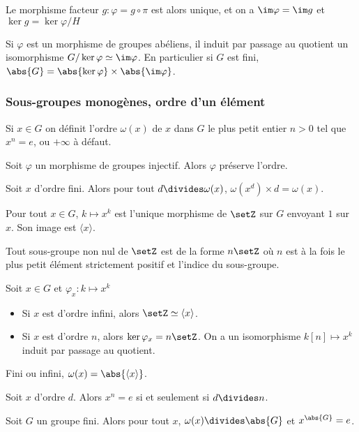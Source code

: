 \documentclass[a4paper,11pt,twocolumn]{article}\usepackage[landscape]{geometry}
\begin{document}
      Le morphisme facteur $g: \varphi = g\circ \pi$ est alors unique, et on a $\im\varphi = \im g$ et $\ker g = \ker\varphi/H$

       Si $\varphi$ est un morphisme de groupes abéliens, il induit par passage au quotient un isomorphisme $G/\ker\varphi \simeq \im\varphi$. En particulier si $G$ est fini, $\abs{G} = \abs{\ker\varphi}\times\abs{\im\varphi}$.

    \subsubsection{Sous-groupes monogènes, ordre d'un élément}

       Si $x\in G$ on définit l'ordre $\omega(x)$ de $x$ dans $G$ le plus petit entier $n>0$ tel que $x^n=e$, ou $+\infty$ à défaut.

       Soit $\varphi$ un morphisme de groupes injectif. Alors $\varphi$ préserve l'ordre.

       Soit $x$ d'ordre fini. Alors pour tout $d\divides \omega(x)$, $\omega(x^d)\times d = \omega(x)$.

       Pour tout $x\in G$, $k\mapsto x^k$ est l'unique morphisme de $\setZ$ sur $G$ envoyant $1$ sur $x$. Son image est $\langle x\rangle$.

       Tout sous-groupe non nul de $\setZ$ est de la forme $n\setZ$ où $n$ est à la fois le plus petit élément strictement positif et l'indice du sous-groupe.

       Soit $x\in G$ et $\varphi_x:k\mapsto x^k$
      \begin{itemize}
        \item Si $x$ est d'ordre infini, alors $\setZ\simeq\langle x\rangle$.
        \item Si $x$ est d'ordre $n$, alors $\ker\varphi_x = n\setZ$. On a un isomorphisme $k [n]\mapsto x^k$ induit par passage au quotient.
      \end{itemize}

       Fini ou infini, $\omega(x)=\abs{\langle x\rangle}$.

       Soit $x$ d'ordre $d$. Alors $x^n=e$ si et seulement si $d\divides n$.

       Soit $G$ un groupe fini. Alors pour tout $x$, $\omega(x)\divides\abs{G}$ et $x^{\abs{G}}=e$.
\end{document}
